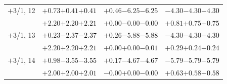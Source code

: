 \documentclass[compress]{beamer}
\begin{document}
\begin{frame}
\begin{tabular}{r | c | c | c}
$+$3/1, 12 & $+0.73$\hspace{0.1 cm}$+0.41$\hspace{0.1 cm}\textcolor{black}{$+0.41$} & $+0.46$\hspace{0.1 cm}$-6.25$\hspace{0.1 cm}\textcolor{black}{$-6.25$} & $-4.30$\hspace{0.1 cm}$-4.30$\hspace{0.1 cm}\textcolor{black}{$-4.30$} \\
           & $+2.20$\hspace{0.1 cm}$+2.20$\hspace{0.1 cm}\textcolor{black}{$+2.21$} & $+0.00$\hspace{0.1 cm}$-0.00$\hspace{0.1 cm}\textcolor{black}{$-0.00$} & $+0.81$\hspace{0.1 cm}$+0.75$\hspace{0.1 cm}\textcolor{black}{$+0.75$} \\
$+$3/1, 13 & $+0.23$\hspace{0.1 cm}$-2.37$\hspace{0.1 cm}\textcolor{black}{$-2.37$} & $+0.26$\hspace{0.1 cm}$-5.88$\hspace{0.1 cm}\textcolor{black}{$-5.88$} & $-4.30$\hspace{0.1 cm}$-4.30$\hspace{0.1 cm}\textcolor{black}{$-4.30$} \\
           & $+2.20$\hspace{0.1 cm}$+2.20$\hspace{0.1 cm}\textcolor{black}{$+2.21$} & $+0.00$\hspace{0.1 cm}$+0.00$\hspace{0.1 cm}\textcolor{black}{$-0.01$} & $+0.29$\hspace{0.1 cm}$+0.24$\hspace{0.1 cm}\textcolor{black}{$+0.24$} \\
$+$3/1, 14 & $+0.98$\hspace{0.1 cm}$-3.55$\hspace{0.1 cm}\textcolor{black}{$-3.55$} & $+0.17$\hspace{0.1 cm}$-4.67$\hspace{0.1 cm}\textcolor{black}{$-4.67$} & $-5.79$\hspace{0.1 cm}$-5.79$\hspace{0.1 cm}\textcolor{black}{$-5.79$} \\
           & $+2.00$\hspace{0.1 cm}$+2.00$\hspace{0.1 cm}\textcolor{black}{$+2.01$} & $-0.00$\hspace{0.1 cm}$+0.00$\hspace{0.1 cm}\textcolor{black}{$-0.00$} & $+0.63$\hspace{0.1 cm}$+0.58$\hspace{0.1 cm}\textcolor{black}{$+0.58$} \\

\end{tabular}
\end{frame}
\end{document}
